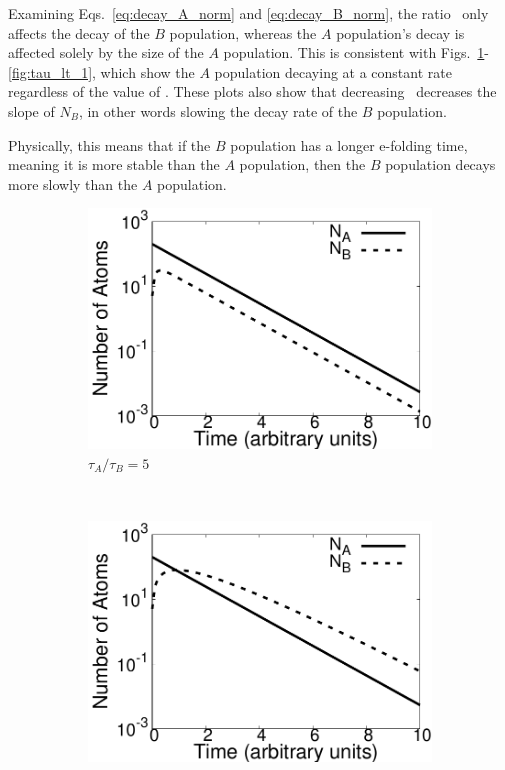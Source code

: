\documentclass[pra,twocolumn,showpacs,amsmath,amssymb]{revtex4-1}
\begin{document}
Examining Eqs.~\ref{eq:decay_A_norm} and \ref{eq:decay_B_norm}, the ratio
 \trel~only affects the decay of the $B$ population, whereas the $A$
 population's decay is affected solely by the size of the $A$ population.
This is consistent with Figs.~\ref{fig:tau_gt_1}-\ref{fig:tau_lt_1}, which show
the $A$ population decaying at a constant rate regardless of the value of \trel.
These plots also show that decreasing \trel~decreases the slope of $N_B$,
in other words slowing the decay rate of the $B$ population.

Physically, this means that if the $B$ population has a longer e-folding time,
meaning it is more stable than the $A$ population, then the $B$ population decays
more slowly than the $A$ population.

\begin{figure}
  \begin{subfigure}[t]{.7\linewidth}
    \includegraphics[width=\linewidth]{t_gt_1.pdf}
    \caption{$\tau_A / \tau_B=5$}
    \label{fig:tau_gt_1}
  \end{subfigure}
~
  \begin{subfigure}[t]{.7\linewidth}
    \includegraphics[width=\linewidth]{t_eq_1.pdf}

\end{subfigure}
\end{figure}
\end{document}
